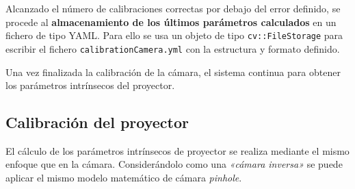 \begin{itemize}
\end{itemize}
      
Alcanzado el número de calibraciones correctas por debajo del error definido, se procede al \textbf{almacenamiento de los últimos parámetros calculados} en un fichero de tipo YAML. Para ello se usa un objeto de tipo \texttt{cv::FileStorage} para escribir el fichero \texttt{calibrationCamera.yml} con la estructura y formato definido.


Una vez finalizada la calibración de la cámara, el sistema continua para obtener los parámetros intrínsecos del proyector.

\subsection{Calibración del proyector}
El cálculo de los parámetros intrínsecos de proyector se realiza mediante el mismo enfoque que en la cámara. Considerándolo como una \textit{«cámara inversa»} se puede aplicar el mismo modelo matemático de cámara \emph{pinhole}.

